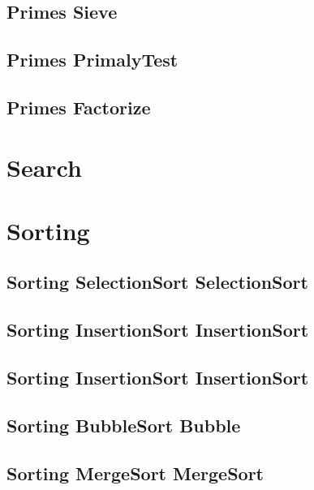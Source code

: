 \subsection{Primes Sieve}
\raggedbottom
\hrulefill
\subsection{Primes PrimalyTest}
\raggedbottom
\hrulefill
\subsection{Primes Factorize}
\raggedbottom
\hrulefill

\section{Search}

\section{Sorting}
\subsection{Sorting SelectionSort SelectionSort}
\raggedbottom
\hrulefill
\subsection{Sorting InsertionSort InsertionSort}
\raggedbottom
\hrulefill
\subsection{Sorting InsertionSort InsertionSort}
\raggedbottom
\hrulefill
\subsection{Sorting BubbleSort Bubble}
\raggedbottom
\hrulefill
\subsection{Sorting MergeSort MergeSort}
\raggedbottom
\hrulefill
